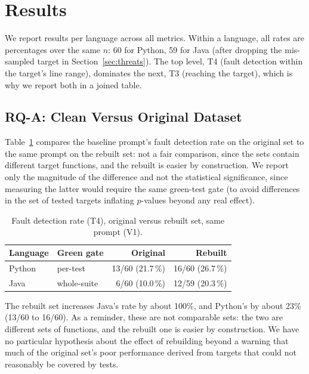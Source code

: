 \section{Results}\label{sec:results}

We report results per language across all metrics. Within a language, all rates are
percentages over the same $n$: 60 for Python, 59 for Java (after dropping the mis-sampled
target in Section~\ref{sec:threats}). The top level, T4 (fault detection within the target's
line range), dominates the next, T3 (reaching the target), which is why we report both in a
joined table.

\subsection{RQ-A: Clean Versus Original Dataset}\label{sec:rqa}

Table~\ref{tab:rqa} compares the baseline prompt's fault detection rate on the original set to
the same prompt on the rebuilt set: not a fair comparison, since the sets contain different
target functions, and the rebuilt is easier by construction. We report only the magnitude of
the difference and not the statistical significance, since measuring the latter would require
the same green-test gate (to avoid differences in the set of tested targets inflating
$p$-values beyond any real effect).

\begin{table}[t]
\centering
\caption{Fault detection rate (T4), original versus rebuilt set, same prompt (V1).}
\label{tab:rqa}
\begin{tabular}{llrr}
\toprule
Language & Green gate & Original & Rebuilt \\
\midrule
Python & per-test        & 13/60 (21.7\,\%) & 16/60 (26.7\,\%) \\
Java   & whole-suite     & 6/60 (10.0\,\%)  & 12/59 (20.3\,\%) \\
\bottomrule
\end{tabular}
\end{table}

The rebuilt set increases Java's rate by about 100\%, and Python's by about 23\% (13/60 to
16/60).
As a reminder, these are not comparable sets: the two are different sets of functions, and the
rebuilt one is easier by construction. We have no particular hypothesis about the effect of
rebuilding beyond a warning that much of the original set's poor performance derived from
targets that could not reasonably be covered by tests.


